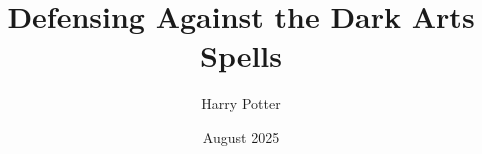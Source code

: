 \documentclass{cornell}
\title{Defensing Against the Dark Arts Spells}
\author{Harry Potter}
\date{August 2025}
\begin{document}
\maketitle
\makecopyright








\contentspage
\tablelistpage
\figurelistpage









\end{document}
